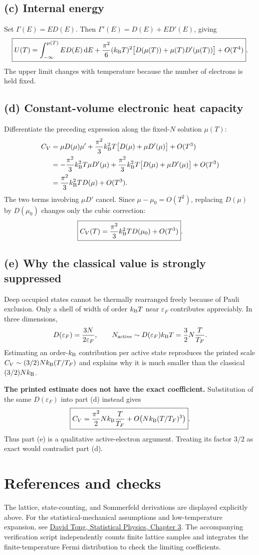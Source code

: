 \subsection*{(c) Internal energy}
Set $\Gamma(E)=E D(E)$. Then $\Gamma'(E)=D(E)+E D'(E)$, giving
\[
\boxed{U(T)=\int_{-\infty}^{\mu(T)}E D(E)\mathop{}\!\mathrm{d} E
+\frac{\pi^2}{6}(k_{\mathrm B} T)^2
\bigl[D(\mu(T))+\mu(T)D'(\mu(T))\bigr]+O(T^4)}.
\]
The upper limit changes with temperature because the number of electrons is held fixed.

\subsection*{(d) Constant-volume electronic heat capacity}
Differentiate the preceding expression along the fixed-$N$ solution $\mu(T)$:
\begin{align*}
C_V&=\mu D(\mu)\mu'
+\frac{\pi^2}{3}k_{\mathrm B}^2T\bigl[D(\mu)+\mu D'(\mu)\bigr]+O(T^3)\\
&=-\frac{\pi^2}{3}k_{\mathrm B}^2T\mu D'(\mu)
+\frac{\pi^2}{3}k_{\mathrm B}^2T\bigl[D(\mu)+\mu D'(\mu)\bigr]+O(T^3)\\
&=\frac{\pi^2}{3}k_{\mathrm B}^2T D(\mu)+O(T^3).
\end{align*}
The two terms involving $\mu D'$ cancel. Since $\mu-\mu_0=O(T^2)$, replacing $D(\mu)$ by $D(\mu_0)$ changes only the cubic correction:
\[
\boxed{C_V(T)=\frac{\pi^2}{3}k_{\mathrm B}^2T D(\mu_0)+O(T^3)}.
\]

\subsection*{(e) Why the classical value is strongly suppressed}
Deep occupied states cannot be thermally rearranged freely because of Pauli exclusion. Only a shell of width of order $k_{\mathrm B} T$ near $\varepsilon_F$ contributes appreciably. In three dimensions,
\[
D(\varepsilon_F)=\frac{3N}{2\varepsilon_F},\qquad
N_{\rm active}\sim D(\varepsilon_F)k_{\mathrm B} T=\frac32N\frac T{T_F}.
\]
Estimating an order-$k_{\mathrm B}$ contribution per active state reproduces the printed scale
$C_V\sim(3/2)Nk_{\mathrm B}(T/T_F)$ and explains why it is much smaller than the classical $(3/2)Nk_{\mathrm B}$.

\textbf{The printed estimate does not have the exact coefficient.} Substitution of the same $D(\varepsilon_F)$ into part (d) instead gives
\[
\boxed{C_V=\frac{\pi^2}{2}Nk_{\mathrm B}\frac T{T_F}
+O\!\left(Nk_{\mathrm B}(T/T_F)^3\right)}.
\]
Thus part (e) is a qualitative active-electron argument. Treating its factor $3/2$ as exact would contradict part (d).

\section*{References and checks}
The lattice, state-counting, and Sommerfeld derivations are displayed explicitly above. For the statistical-mechanical assumptions and low-temperature expansion, see
\href{https://www.damtp.cam.ac.uk/user/tong/statphys/statmechhtml/S3.html}{David Tong, Statistical Physics, Chapter 3}.
The accompanying verification script independently counts finite lattice samples and integrates the finite-temperature Fermi distribution to check the limiting coefficients.

